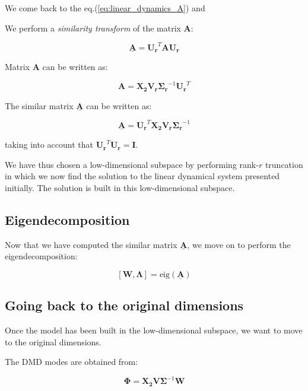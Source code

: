 \documentclass[10pt,twocolumn]{article}
\begin{document}
We come back to the eq.(\ref{eq:linear_dynamics_A}) and

We perform a \textit{similarity transform} of the matrix $\bm{A}$:

\begin{equation} \label{eq:similarity-transform}
\underline{\bm{A}} = \bm{U_r}^T \bm{A} \bm{U_r}
\end{equation}

Matrix $\bm{A}$ can be written as:

\begin{equation} \label{eq:A}
\bm{A} = \bm{X_2} \bm{V_r} \bm{\Sigma_r}^{-1} \bm{U_r}^T
\end{equation}

The similar matrix $\underline{\bm{A}}$ can be written as:

\begin{equation} \label{eq:A_underline}
\underline{\bm{A}} = \bm{U_r}^T \bm{X_2} \bm{V_r} \bm{\Sigma_r}^{-1} 
\end{equation}

taking into account that $\bm{U_r}^T \bm{U_r} = \bm{I}$.

We have thus chosen a low-dimensional subspace by performing rank-$r$ truncation in which we now find the solution to the linear dynamical system presented initially. The solution is built in this low-dimensional subspace.

\subsection{Eigendecomposition}

Now that we have computed the similar matrix $\underline{\bm{A}}$, we move on to perform the eigendecomposition:

\begin{equation} \label{eq:A_underline}
[\bm{W}, \bm{\Lambda}] = \text{eig}(\underline{\bm{A}})
\end{equation}

\subsection{Going back to the original dimensions}

Once the model has been built in the low-dimensional subspace, we want to move to the original dimensions. 

The DMD modes are obtained from:

\begin{equation} \label{eq:A_underline}
\bm{\Phi} = \bm{X_2} \bm{V} \bm{\Sigma}^{-1} \bm{W}
\end{equation}
\end{document}
